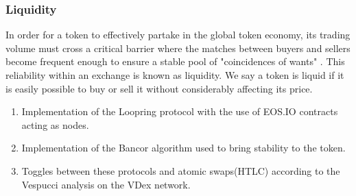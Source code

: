 \documentclass[]{article}
\begin{document}
	
	\subsubsection{Liquidity}
	In order for a token to effectively partake in the global token
	economy, its trading volume must cross a critical barrier where
	the matches between buyers and sellers become frequent enough to ensure a stable pool of "coincidences of wants" \cite{10}. 
	This reliability within an exchange is known as liquidity. We say a token is liquid if it is easily possible to buy or sell it without considerably affecting its price.
	
	\begin{enumerate} 
		\item Implementation of the Loopring protocol with the use of EOS.IO contracts acting as nodes.\cite{7}
		\item Implementation of the Bancor algorithm used to bring stability to the token.\cite{10}
		\item Toggles between these protocols and atomic swaps(HTLC) according to the Vespucci analysis on the VDex network.
		\end{enumerate}
	
\end{document}
